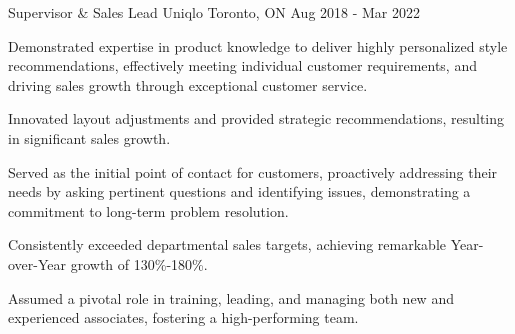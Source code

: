 \begin{cventries}

\cventry
{Supervisor \& Sales Lead} %
{Uniqlo} %
{Toronto, ON} %
{Aug 2018 - Mar 2022} %
{ %
\begin{cvitems}
\item {Demonstrated expertise in product knowledge to deliver highly personalized style recommendations, effectively meeting individual customer requirements, and driving sales growth through exceptional customer service.}
\item {Innovated layout adjustments and provided strategic recommendations, resulting in significant sales growth.}
\item {Served as the initial point of contact for customers, proactively addressing their needs by asking pertinent questions and identifying issues, demonstrating a commitment to long-term problem resolution.}
\item {Consistently exceeded departmental sales targets, achieving remarkable Year-over-Year growth of 130\%-180\%.}
\item {Assumed a pivotal role in training, leading, and managing both new and experienced associates, fostering a high-performing team.}
\end{cvitems}
}

\end{cventries}
